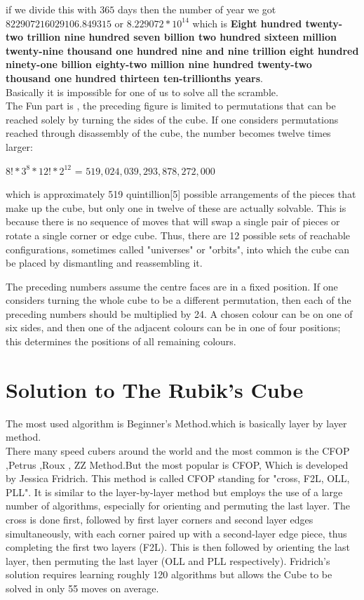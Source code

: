\documentclass{article}
\begin{document}
if we divide this with $365$ days then the number of year we got $822907216029106.849315$ or $8.229072 * 10^{14}$ which is \textbf{Eight hundred twenty-two trillion nine hundred seven billion two hundred sixteen million twenty-nine thousand one hundred nine and nine trillion eight hundred ninety-one billion eighty-two million nine hundred twenty-two thousand one hundred thirteen ten-trillionths years}.\\
Basically it is impossible for one of us to solve all the scramble.\\
The Fun part is , the preceding figure is limited to permutations that can be reached solely by turning the sides of the cube. If one considers permutations reached through disassembly of the cube, the number becomes twelve times larger:
\begin{center}
     $ 8! * 3^{8} * {12!} * 2^{12} $ = $519,024,039,293,878,272,000$
\end{center}
which is approximately 519 quintillion[5] possible arrangements of the pieces that make up the cube, but only one in twelve of these are actually solvable. This is because there is no sequence of moves that will swap a single pair of pieces or rotate a single corner or edge cube. Thus, there are 12 possible sets of reachable configurations, sometimes called "universes" or "orbits", into which the cube can be placed by dismantling and reassembling it.

The preceding numbers assume the centre faces are in a fixed position. If one considers turning the whole cube to be a different permutation, then each of the preceding numbers should be multiplied by 24. A chosen colour can be on one of six sides, and then one of the adjacent colours can be in one of four positions; this determines the positions of all remaining colours.
\section{Solution to The Rubik's Cube}
The most used algorithm is Beginner's Method.which is basically layer by layer method.\\
There many speed cubers around the world and the most common is the CFOP ,Petrus ,Roux , ZZ Method.But the most popular is CFOP, Which is developed by  Jessica Fridrich. This method is called CFOP standing for "cross, F2L, OLL, PLL". It is similar to the layer-by-layer method but employs the use of a large number of algorithms, especially for orienting and permuting the last layer. The cross is done first, followed by first layer corners and second layer edges simultaneously, with each corner paired up with a second-layer edge piece, thus completing the first two layers (F2L). This is then followed by orienting the last layer, then permuting the last layer (OLL and PLL respectively). Fridrich's solution requires learning roughly 120 algorithms but allows the Cube to be solved in only 55 moves on average.\\
\end{document}

